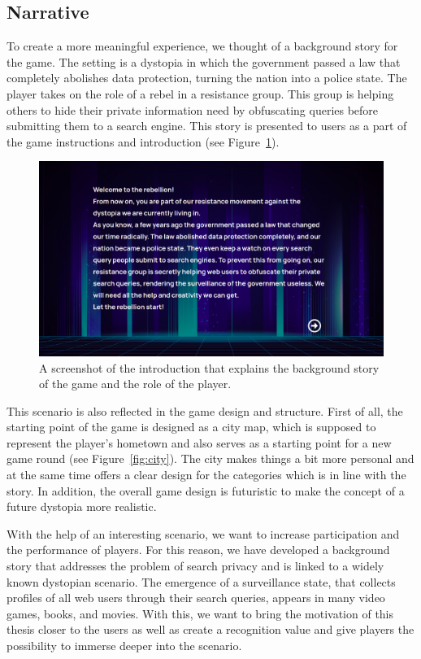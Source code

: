 \subsection*{Narrative}
To create a more meaningful experience, we thought of a background story for the game. The setting is a dystopia in which the government passed a law that completely abolishes data protection, turning the nation into a police state. The player takes on the role of a rebel in a resistance group. This group is helping others to hide their private information need by obfuscating queries before submitting them to a search engine.
This story is presented to users as a part of the game instructions and introduction (see Figure~\ref{fig:intro}).
\begin{figure}[h]
\centering
    \includegraphics[width=1.0\textwidth]{graphics/game/introduction (1).pdf}
    \caption{A screenshot of the introduction that explains the background story of the game and the role of the player.}
    \label{fig:intro}
\end{figure}
This scenario is also reflected in the game design and structure. 
First of all, the starting point of the game is designed as a city map, which is supposed to represent the player's hometown and also serves as a starting point for a new game round (see Figure~\ref{fig:city}). The city makes things a bit more personal and at the same time offers a clear design for the categories which is in line with the story. In addition, the overall game design is futuristic to make the concept of a future dystopia more realistic.\par
With the help of an interesting scenario, we want to increase participation and the performance of players. For this reason, we have developed a background story that addresses the problem of search privacy and is linked to a widely known dystopian scenario. The emergence of a surveillance state, that collects profiles of all web users through their search queries, appears in many video games, books, and movies.
With this, we want to bring the motivation of this thesis closer to the users as well as create a recognition value and give players the possibility to immerse deeper into the scenario.

